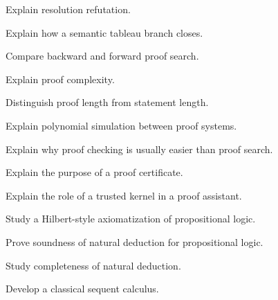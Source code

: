 \begin{exercise}[3]
Explain resolution refutation.
\end{exercise}

\begin{exercise}[3]
Explain how a semantic tableau branch closes.
\end{exercise}

\begin{exercise}[3]
Compare backward and forward proof search.
\end{exercise}

\begin{exercise}[3]
Explain proof complexity.
\end{exercise}

\begin{exercise}[3]
Distinguish proof length from statement length.
\end{exercise}

\begin{exercise}[3]
Explain polynomial simulation between proof systems.
\end{exercise}

\begin{exercise}[3]
Explain why proof checking is usually easier than proof search.
\end{exercise}

\begin{exercise}[3]
Explain the purpose of a proof certificate.
\end{exercise}

\begin{exercise}[3]
Explain the role of a trusted kernel in a proof assistant.
\end{exercise}

\begin{exercise}[4]
Study a Hilbert-style axiomatization of propositional logic.
\end{exercise}

\begin{exercise}[4]
Prove soundness of natural deduction for propositional logic.
\end{exercise}

\begin{exercise}[4]
Study completeness of natural deduction.
\end{exercise}

\begin{exercise}[4]
Develop a classical sequent calculus.
\end{exercise}

